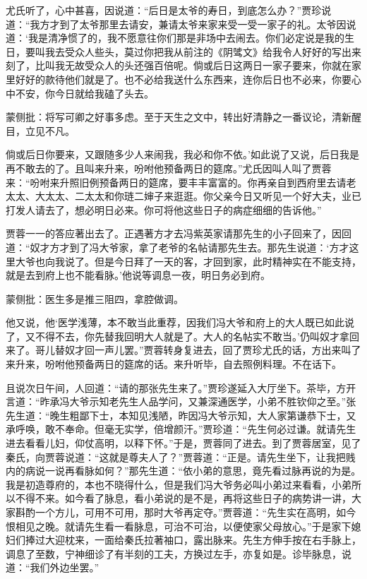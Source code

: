 \begin{parag}


    尤氏听了，心中甚喜，因说道：“后日是太爷的寿日，到底怎么办？”贾珍说道：“我方才到了太爷那里去请安，兼请太爷来家来受一受一家子的礼。太爷因说道：‘我是清净惯了的，我不愿意往你们那是非场中去闹去。你们必定说是我的生日，要叫我去受众人些头，莫过你把我从前注的《阴骘文》给我令人好好的写出来刻了，比叫我无故受众人的头还强百倍呢。倘或后日这两日一家子要来，你就在家里好好的款待他们就是了。也不必给我送什么东西来，连你后日也不必来，你要心中不安，你今日就给我磕了头去。\begin{note}蒙侧批：将写可卿之好事多虑。至于天生之文中，转出好清静之一番议论，清新醒目，立见不凡。\end{note}倘或后日你要来，又跟随多少人来闹我，我必和你不依。’如此说了又说，后日我是再不敢去的了。且叫来升来，吩咐他预备两日的筵席。”尤氏因叫人叫了贾蓉来：“吩咐来升照旧例预备两日的筵席，要丰丰富富的。你再亲自到西府里去请老太太、大太太、二太太和你琏二婶子来逛逛。你父亲今日又听见一个好大夫，业已打发人请去了，想必明日必来。你可将他这些日子的病症细细的告诉他。”
\end{parag}

\begin{parag}
    贾蓉一一的答应著出去了。正遇著方才去冯紫英家请那先生的小子回来了，因回道：“奴才方才到了冯大爷家，拿了老爷的名帖请那先生去。那先生说道：‘方才这里大爷也向我说了。但是今日拜了一天的客，才回到家，此时精神实在不能支持，就是去到府上也不能看脉。’他说等调息一夜，明日务必到府。\begin{note}蒙侧批：医生多是推三阻四，拿腔做调。\end{note}他又说，他‘医学浅薄，本不敢当此重荐，因我们冯大爷和府上的大人既已如此说了，又不得不去，你先替我回明大人就是了。大人的名帖实不敢当。’仍叫奴才拿回来了。哥儿替奴才回一声儿罢。”贾蓉转身复进去，回了贾珍尤氏的话，方出来叫了来升来，吩咐他预备两日的筵席的话。来升听毕，自去照例料理。不在话下。
\end{parag}


\begin{parag}


    且说次日午间，人回道：“请的那张先生来了。”贾珍遂延入大厅坐下。茶毕，方开言道：“昨承冯大爷示知老先生人品学问，又兼深通医学，小弟不胜钦仰之至。”张先生道：“晚生粗鄙下士，本知见浅陋，昨因冯大爷示知，大人家第谦恭下士，又承呼唤，敢不奉命。但毫无实学，倍增颜汗。”贾珍道：“先生何必过谦。就请先生进去看看儿妇，仰仗高明，以释下怀。”于是，贾蓉同了进去。到了贾蓉居室，见了秦氏，向贾蓉说道：“这就是尊夫人了？”贾蓉道：“正是。请先生坐下，让我把贱内的病说一说再看脉如何？”那先生道：“依小弟的意思，竟先看过脉再说的为是。我是初造尊府的，本也不晓得什么，但是我们冯大爷务必叫小弟过来看看，小弟所以不得不来。如今看了脉息，看小弟说的是不是，再将这些日子的病势讲一讲，大家斟酌一个方儿，可用不可用，那时大爷再定夺。”贾蓉道：“先生实在高明，如今恨相见之晚。就请先生看一看脉息，可治不可治，以便使家父母放心。”于是家下媳妇们捧过大迎枕来，一面给秦氏拉著袖口，露出脉来。先生方伸手按在右手脉上，调息了至数，宁神细诊了有半刻的工夫，方换过左手，亦复如是。诊毕脉息，说道：“我们外边坐罢。”
\end{parag}



